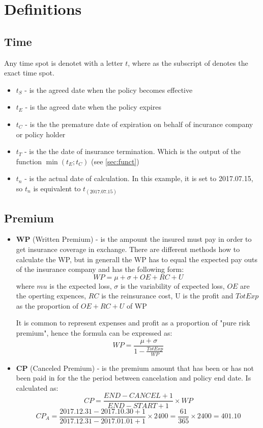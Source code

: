 \documentclass[11pt,a4paper,fleqn]{article}      %
\begin{document}
\section{Definitions}

\subsection{Time}
Any time spot is denotet with a letter $t$, where as the subscript of denotes the exact time spot. 
\begin{itemize}
\item $t_{S}$ - is the agreed date when the policy becomes effective
\item $t_{E}$ - is the agreed date when the policy expires
\item $t_{C}$ - is the the premature date of expiration on behalf of incurance company or policy holder
\item $t_{T}$ - is the the date of insurance termination. Which is the output of the function $\min(t_E; t_C)$ (see \ref{sec:funct})
\item $t_{n}$ - is the actual date of calculation. In this example, it is set to 2017.07.15, so $t_n$ is equivalent to $t_{(2017.07.15)}$
\end{itemize}



\subsection{Premium}


\begin{itemize}
\item \textbf{WP} (Written Premium) - is the ampount the insured must pay in order to get insurance coverage in exchange. There are different methods how to calculate the WP, but in generall the WP has to equal the expected pay outs of the insurance company and has the following form:
$$WP=\mu + \sigma +OE +RC+U$$ 
where $mu$ is the expected loss, $\sigma$ is the variability of expected loss, $OE$ are the operting expences, $RC$ is the reinsurance cost, U is the profit and $TotExp$ as the proportion of $OE+RC+U$ of WP

It is common to represent expenses and profit as a proportion of "pure risk premium", hence the formula can be expressed as:
$$WP=\frac{\mu + \sigma}{1-\frac{TotExp}{WP}}$$ 




\item \textbf{CP} (Canceled Premium) - is the premium amount that has been or has not been paid in for the the period between cancelation and policy end date. Is calculated as: 
$$CP=\frac{END-CANCEL+1}{END-START+1} \times WP $$
$$CP_A=\frac{2017.12.31-2017.10.30+1}{2017.12.31-2017.01.01+1} \times 2400=  \frac{61}{365} \times 2400=401.10 $$


\end{itemize}
\end{document}
